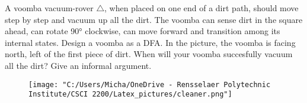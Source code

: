 \documentclass{article}
\begin{document}
\begin{addmargin}[2em]{2em}
	 A voomba vacuum-rover $\triangle$, when placed on one end of a dirt path, should move step
		by step and vacuum up all the dirt. The voomba can sense dirt in the square ahead, can rotate 90° clockwise,
		can move forward and transition among its internal states. Design a voomba as a DFA. In the picture, the
		voomba is facing north, left of the first piece of dirt.
		When will your voomba succesfully vacuum all the dirt? Give an informal argument.\\
		\begin{figure}[h]
			\begin{center}
				\texttt{[image: "C:/Users/Micha/OneDrive - Rensselaer Polytechnic Institute/CSCI 2200/Latex\_pictures/cleaner.png"]}\\
			\end{center}
		\end{figure}
	

\end{addmargin}
\end{document}
